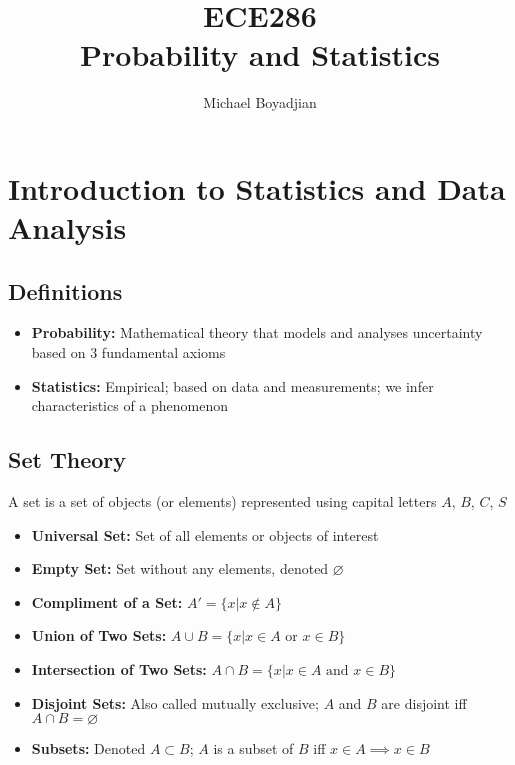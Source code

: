\documentclass[11pt]{article}
\begin{document}
\title{ECE286 \\ Probability and Statistics}
\author{Michael Boyadjian}
\maketitle
\pagebreak

\tableofcontents

\pagebreak

\bigskip
\bigskip
\bigskip


\section{Introduction to Statistics and Data Analysis}

\subsection{Definitions}
\begin{itemize}
\item \textbf{Probability:} Mathematical theory that models and analyses uncertainty based on 3 fundamental axioms
\item \textbf{Statistics:} Empirical; based on data and measurements; we infer characteristics of a phenomenon
\end{itemize}

\subsection{Set Theory}
A set is a set of objects (or elements) represented using capital letters $A$, $B$, $C$, $S$
\begin{itemize}
\item \textbf{Universal Set:} Set of all elements or objects of interest
\item \textbf{Empty Set:} Set without any elements, denoted $\varnothing$
\item \textbf{Compliment of a Set:} $A' = \{x | x \notin A\} $
\item \textbf{Union of Two Sets:} $ A \cup B = \{x | x \in A \text{ or } x \in B\}$
\item \textbf{Intersection of Two Sets:} $ A \cap B = \{x | x \in A \text{ and } x \in B\}$
\item \textbf{Disjoint Sets:}  Also called mutually exclusive; $A$ and $B$ are disjoint iff  $A \cap B = \varnothing$
\item \textbf{Subsets:} Denoted $A \subset B$; $A$ is a subset of $B$ iff $x \in A \implies x \in B$
\end{itemize}
\end{document}
